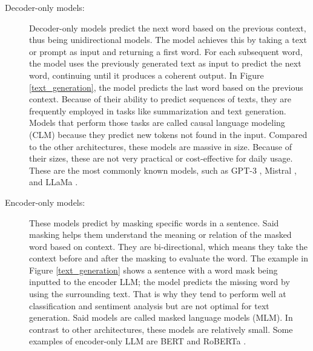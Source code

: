 \begin{description}

\item[Decoder-only models:] Decoder-only models predict the next word based on the previous context, thus being unidirectional models. The model achieves this by taking a text or prompt as input and returning 
a first word. For each subsequent word, the model uses the previously generated text as input to predict the next word, continuing until it produces a coherent output. In Figure \ref{text_generation},
the model predicts the last word based on the previous context. Because of their ability to predict sequences of texts, they are frequently employed in tasks like summarization and text generation. Models
that perform those tasks are called causal language modeling (CLM) because they predict new tokens not found in the input. Compared to the other architectures, these models are massive
in size. Because of their sizes, these are not very practical or cost-effective for daily usage. These are the most commonly known models, such as GPT-3 \cite{DBLP:journals/corr/abs-2005-14165},
Mistral \cite{jiang2023mistral7b}, and LLaMa \cite{touvron2023llamaopenefficientfoundation}.

\item[Encoder-only models:] These models predict by masking specific words in a sentence. Said masking helps them understand the meaning or relation of the masked word based on context. They are bi-directional,
which means they take the context before and after the masking to evaluate the word. The example in Figure \ref{text_generation} shows a sentence with a word mask being inputted to
the encoder LLM; the model predicts the missing word by using the surrounding text. That is why they tend to perform well at classification and sentiment analysis but are not optimal for text
generation. Said models are called masked language models (MLM). In contrast to other architectures, these models are relatively small. Some examples of encoder-only LLM are BERT
\cite{DBLP:journals/corr/abs-1810-04805} and RoBERTa \cite{liu2019robertarobustlyoptimizedbert}.


\end{description}
